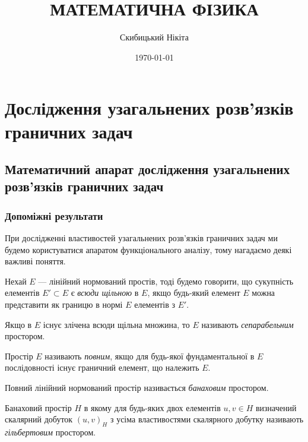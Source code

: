 

\title{{\Huge МАТЕМАТИЧНА ФІЗИКА}}
\author{Скибицький Нікіта}
\date{\today}
 




\tableofcontents

\setcounter{section}{4}

\section{Дослідження узагальнених розв'язків граничних задач}

\subsection{Математичний апарат дослідження узагальнених розв'язків граничних задач}

\subsubsection{Допоміжні результати}

При дослідженні властивостей узагальнених розв'язків граничних задач ми будемо користуватися апаратом функціонального аналізу, тому нагадаємо деякі важливі поняття.

\begin{definition}
    Нехай $E$ --- лінійний нормований простів, тоді будемо говорити, що сукупність елементів $E' \subset E$ є \emph{всюди щільною} в $E$, якщо будь-який елемент $E$ можна представити як границю в нормі $E$ елементів з $E'$.
\end{definition}

\begin{definition}
    Якщо в $E$ існує злічена всюди щільна множина, то $E$ називають \emph{сепарабельним} простором.
\end{definition}

\begin{definition}
    Простір $E$ називають \emph{повним}, якщо для будь-якої фундаментальної в $E$ послідовності існує граничний елемент, що належить $E$.
\end{definition}

\begin{definition}
    Повний лінійний нормований простір називається \emph{банаховим} простором.
\end{definition}

\begin{definition}
    Банаховий простір $H$ в якому для будь-яких двох елементів $u, v \in H$ визначений скалярний добуток $(u, v)_H$ з усіма властивостями скалярного добутку називають \emph{гільбертовим} простором.
\end{definition}

